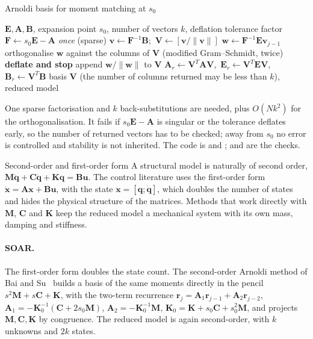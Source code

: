 \begin{algbox}{Arnoldi basis for moment matching at $s_0$}
\begin{pseudo}
\Require $\bm E,\bm A,\bm B$, expansion point $s_0$, number of vectors $k$, deflation tolerance
\State factor $\bm F\gets s_0\bm E-\bm A$ \emph{once} (sparse)
\State $\bm v\gets\bm F^{-1}\bm B$;\ $\bm V\gets[\bm v/\|\bm v\|]$
  \State $\bm w\gets\bm F^{-1}\bm E\bm v_{j-1}$ 
  \State orthogonalise $\bm w$ against the columns of $\bm V$ (modified Gram--Schmidt, twice)
   \textbf{deflate and stop} \Else{} append $\bm w/\|\bm w\|$ to $\bm V$ \EndIf
\EndFor
\State $\bm A_r\gets\bm V^T\bm A\bm V$,\ $\bm E_r\gets\bm V^T\bm E\bm V$,\ $\bm B_r\gets\bm V^T\bm B$ 
\Ensure basis $\bm V$ (the number of columns returned may be less than $k$), reduced model
\end{pseudo}
\end{algbox}

One sparse factorisation and $k$ back-substitutions are needed, plus $O(Nk^2)$ for the orthogonalisation. It fails if $s_0\bm E-\bm A$ is singular or the tolerance deflates early, so the number of returned vectors has to be checked; away from $s_0$ no error is controlled and stability is not inherited. The code is  and ;  and  are the checks.

\begin{sidenote}{Second-order and first-order form}
A structural model is naturally of second order, $\bm M\ddot{\bm q}+\bm C\dot{\bm q}+\bm K\bm q=\bm B\bm u$. The control literature uses the first-order form $\dot{\bm x}=\bm A\bm x+\bm B\bm u$, with the state $\bm x=[\bm q;\dot{\bm q}]$, which doubles the number of states and hides the physical structure of the matrices. Methods that work directly with $\bm M$, $\bm C$ and $\bm K$ keep the reduced model a mechanical system with its own mass, damping and stiffness.
\end{sidenote}

\paragraph{SOAR.}
The first-order form doubles the state count. The second-order Arnoldi method of Bai and Su~\cite{bai2005soar} builds a basis of the same moments directly in the pencil $s^2\bm M+s\bm C+\bm K$, with the two-term recurrence $\bm r_j=\bm A_1\bm r_{j-1}+\bm A_2\bm r_{j-2}$, $\bm A_1=-\bm K_0^{-1}(\bm C+2s_0\bm M)$, $\bm A_2=-\bm K_0^{-1}\bm M$, $\bm K_0=\bm K+s_0\bm C+s_0^2\bm M$, and projects $\bm M,\bm C,\bm K$ by congruence. The reduced model is again second-order, with $k$ unknowns and $2k$ states.

